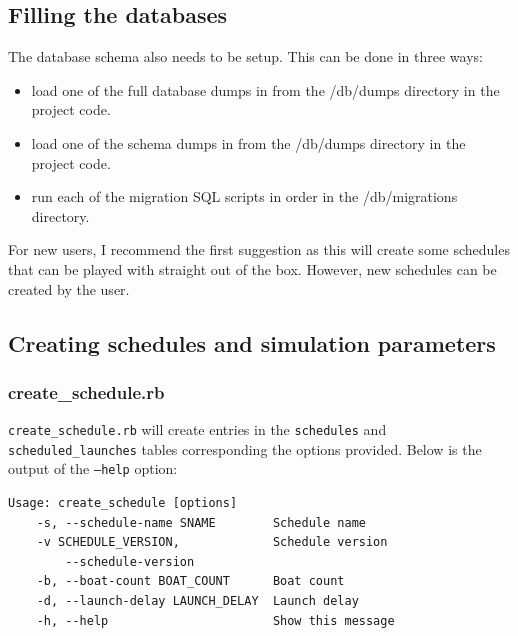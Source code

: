 \subsection{Filling the databases}

The database schema also needs to be setup. This can be done in three ways:
\begin{itemize}
  \item load one of the full database dumps in from the /db/dumps directory in the project code.
  \item load one of the schema dumps in from the /db/dumps directory in the project code.
  \item run each of the migration SQL scripts in order in the /db/migrations directory.
\end{itemize}
For new users, I recommend the first suggestion as this will create some schedules that can be played with straight out of the box. However, new schedules can be created by the user.

\subsection{Creating schedules and simulation parameters}


\subsubsection{create\_schedule.rb}

\texttt{create\_schedule.rb} will create entries in the \texttt{schedules} and \texttt{scheduled\_launches} tables corresponding the options provided. Below is the output of the \texttt{--help} option:

\begin{lstlisting}[basicstyle=\ttfamily]
Usage: create_schedule [options]
    -s, --schedule-name SNAME        Schedule name
    -v SCHEDULE_VERSION,             Schedule version
        --schedule-version
    -b, --boat-count BOAT_COUNT      Boat count
    -d, --launch-delay LAUNCH_DELAY  Launch delay
    -h, --help                       Show this message
\end{lstlisting}

